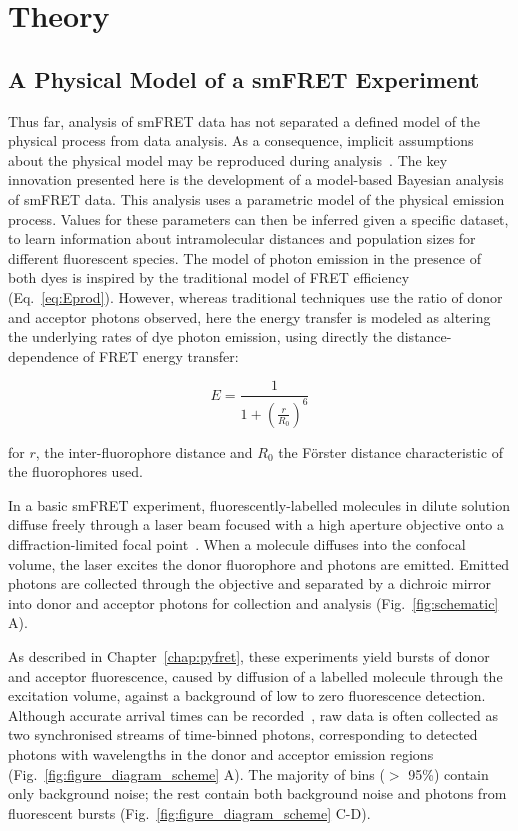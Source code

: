 \clearpage

\section{Theory}
\subsection{A Physical Model of a smFRET Experiment}
\label{subsect:model}
Thus far, analysis of smFRET data has not separated a defined model of the physical process from data analysis. As a consequence, implicit assumptions about the physical model may be reproduced during analysis~\cite{ying00}. The key innovation presented here is the development of a model-based Bayesian analysis of smFRET data. This analysis uses a parametric model of the physical emission process. Values for these parameters can then be inferred given a specific dataset, to learn information about intramolecular distances and population sizes for different fluorescent species. The model of photon emission in the presence of both dyes is inspired by the traditional model of FRET efficiency (Eq.~\ref{eq:Eprod}). However, whereas traditional techniques use the ratio of donor and acceptor photons observed, here the energy transfer is modeled as altering the underlying rates of dye photon emission, using directly the distance-dependence of FRET energy transfer:

\begin{equation}
E = \frac{1}{1+ (\frac{r}{R_0})^6}
\label{eq:FRET_dist}
\end{equation}

for $r$, the inter-fluorophore distance and $R_0$ the F\"orster distance characteristic of the fluorophores used.

In a basic smFRET experiment, fluorescently-labelled molecules in dilute solution diffuse freely through a laser beam focused with a high aperture objective onto a diffraction-limited focal point~\cite{schuler05}.  When a molecule diffuses into the confocal volume, the laser excites the donor fluorophore and photons are emitted.  Emitted photons are collected through the objective and separated by a dichroic mirror into donor and acceptor photons for collection and analysis (Fig.~\ref{fig:schematic} A).

As described in Chapter~\ref{chap:pyfret}, these experiments yield bursts of donor and acceptor fluorescence, caused by diffusion of a labelled molecule through the excitation volume, against a background of low to zero fluorescence detection.  Although accurate arrival times can be recorded~\cite{chung09}, raw data is often collected as two synchronised streams of time-binned photons, corresponding to detected photons with wavelengths in the donor and acceptor emission regions (Fig.~\ref{fig:figure_diagram_scheme} A).  The majority of bins ($>$ 95\%) contain only background noise; the rest contain both background noise and photons from fluorescent bursts (Fig.~\ref{fig:figure_diagram_scheme} C-D).

